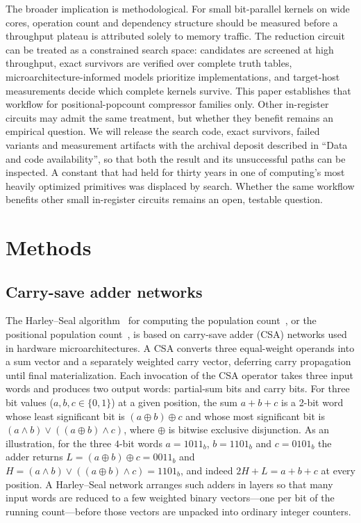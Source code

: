 \documentclass[fleqn,10pt]{wlscirep}
\begin{document}
The broader implication is methodological. For small bit-parallel kernels on wide cores, operation count and dependency structure should be measured before a throughput plateau is attributed solely to memory traffic. The reduction circuit can be treated as a constrained search space: candidates are screened at high throughput, exact survivors are verified over complete truth tables, microarchitecture-informed models prioritize implementations, and target-host measurements decide which complete kernels survive. This paper establishes that workflow for positional-popcount compressor families only. Other in-register circuits may admit the same treatment, but whether they benefit remains an empirical question. We will release the search code, exact survivors, failed variants and measurement artifacts with the archival deposit described in ``Data and code availability'', so that both the result and its unsuccessful paths can be inspected. A constant that had held for thirty years in one of computing's most heavily optimized primitives was displaced by search. Whether the same workflow benefits other small in-register circuits remains an open, testable question.

\section*{Methods}

\subsection*{Carry-save adder networks}
The Harley--Seal algorithm~\cite{warren2007} for computing the population count~\cite{Mula2016}, or the positional population count~\cite{klarqvist2019}, is based on carry-save adder (CSA) networks used in hardware microarchitectures. A CSA converts three equal-weight operands into a sum vector and a separately weighted carry vector, deferring carry propagation until final materialization. Each invocation of the CSA operator takes three input words and produces two output words: partial-sum bits and carry bits. For three bit values ($a,b,c\in\{0,1\}$) at a given position, the sum $a+b+c$ is a 2-bit word whose least significant bit is $(a\oplus b)\oplus c$ and whose most significant bit is $(a\land b)\lor((a\oplus b)\land c)$, where $\oplus$ is bitwise exclusive disjunction. As an illustration, for the three $4$-bit words $a=1011_b$, $b=1101_b$ and $c=0101_b$ the adder returns $L=(a\oplus b)\oplus c=0011_b$ and $H=(a\land b)\lor((a\oplus b)\land c)=1101_b$, and indeed $2H+L=a+b+c$ at every position. A Harley--Seal network arranges such adders in layers so that many input words are reduced to a few weighted binary vectors---one per bit of the running count---before those vectors are unpacked into ordinary integer counters.
\end{document}
